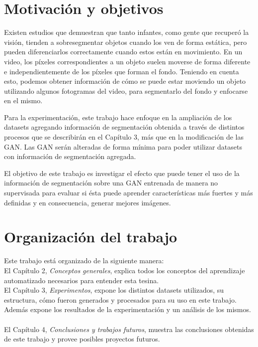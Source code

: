 \documentclass[spanish]{report}
\begin{document}
\section{Motivación y objetivos}

Existen estudios \cite{visual_parsing} que demuestran que tanto infantes, como gente que recuperó la visión, tienden a sobresegmentar objetos cuando los ven de forma estática, pero pueden diferenciarlos correctamente cuando estos están en movimiento. En un video, los píxeles correspondientes a un objeto suelen moverse de forma diferente e independientemente de los píxeles que forman el fondo. Teniendo en cuenta esto, podemos obtener información de cómo se puede estar moviendo un objeto utilizando algunos fotogramas del video, para segmentarlo del fondo y enfocarse en el mismo.

Para la experimentación, este trabajo hace enfoque en la ampliación de los datasets agregando información de segmentación obtenida a través de distintos procesos que se describirán en el Capítulo 3, más que en la modificación de las GAN. Las GAN serán alteradas de forma mínima para poder utilizar datasets con información de segmentación agregada.

El objetivo de este trabajo es investigar el efecto que puede tener el uso de la información de segmentación sobre una GAN entrenada de manera no supervisada para evaluar si ésta puede aprender características más fuertes y más definidas y en consecuencia, generar mejores imágenes.

\section{Organización del trabajo}

\noindent Este trabajo está organizado de la siguiente manera: 
~\\

El Capítulo 2, \textit{Conceptos generales}, explica todos los conceptos del aprendizaje automatizado necesarios para entender esta tesina.
~\\

El Capítulo 3, \textit{Experimentos}, expone los distintos datasets utilizados, su estructura, cómo fueron generados y procesados para su uso en este trabajo. Además expone los resultados de la experimentación y un análisis de los mismos.
~\\

El Capítulo 4, \textit{Conclusiones y trabajos futuros}, muestra las conclusiones obtenidas de este trabajo y provee posibles proyectos futuros.
~\\
\end{document}
